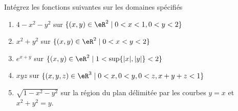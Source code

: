 
\begin{exercice}\label{exoIntMult0001}

Intégrez les fonctions suivantes sur les domaines spécifiés
\begin{enumerate}
\item $ 4 - x^2 - y^2$ sur  $\{(x,y)\in \eR^2 \mid 0<x<1, 0<y<2 \} $
\item $ x^2 + y^2$ sur $\{(x,y)\in \eR^2 \mid 0<x<y<2 \} $
\item $ e^{x+y}$ sur $\{(x,y)\in \eR^2 \mid 1 < \sup\{|x|,|y|\} < 2 \} $
\item $ xyz$ sur $\{(x,y,z)\in \eR^3 \mid 0<x, 0<y, 0<z, x+y+z<1 \} $
\item $ \sqrt{1-x^2-y^2}$  sur la région du plan délimitée par les  courbes $y = x$ et $x^2+y^2=y$.
\end{enumerate}

\end{exercice}
